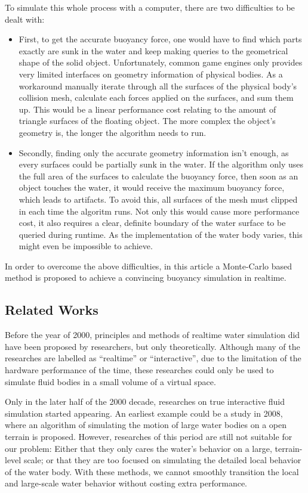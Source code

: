 To simulate this whole process with a computer, there are two difficulties to be dealt with:

\begin{itemize}
	\item
		First, to get the accurate buoyancy force, one would have to find which parts exactly are sunk in the water and keep making queries to the geometrical shape of the solid object.
		Unfortunately, common game engines only provides very limited interfaces on geometry information of physical bodies.
		As a workaround manually iterate through all the surfaces of the physical body's collision mesh, calculate each forces applied on the surfaces, and sum them up.
		This would be a linear performance cost relating to the amount of triangle surfaces of the floating object.
		The more complex the object's geometry is, the longer the algorithm needs to run.

	\item
		Secondly, finding only the accurate geometry information isn't enough, as every surfaces could be partially sunk in the water.
		If the algorithm only uses the full area of the surfaces to calculate the buoyancy force, then soon as an object touches the water, it would receive the maximum buoyancy force, which leads to artifacts.
		To avoid this, all surfaces of the mesh must clipped in each time the algoritm runs.
		Not only this would cause more performance cost, it also requires a clear, definite boundary of the water surface to be queried during runtime.
		As the implementation of the water body varies, this might even be impossible to achieve.
\end{itemize}

In order to overcome the above difficulties, in this article a Monte-Carlo based method is proposed to achieve a convincing buoyancy simulation in realtime.

\subsection{Related Works}
Before the year of 2000, principles and methods of realtime water simulation did have been proposed by researchers\cite{CHE97}, but only theoretically.
Although many of the researches are labelled as ``realtime'' or ``interactive'', due to the limitation of the hardware performance of the time, these researches could only be used to simulate fluid bodies in a small volume of a virtual space.

Only in the later half of the 2000 decade, researches on true interactive fluid simulation started appearing.
An earliest example could be a study in 2008\cite{JUD08}, where an algorithm of simulating the motion of large water bodies on a open terrain is proposed.
However, researches of this period are still not suitable for our problem:
Either that they only cares the water's behavior on a large, terrain-level scale;
or that they are too focused on simulating the detailed local behavior of the water body.
With these methods, we cannot smoothly transition the local and large-scale water behavior without costing extra performance.

